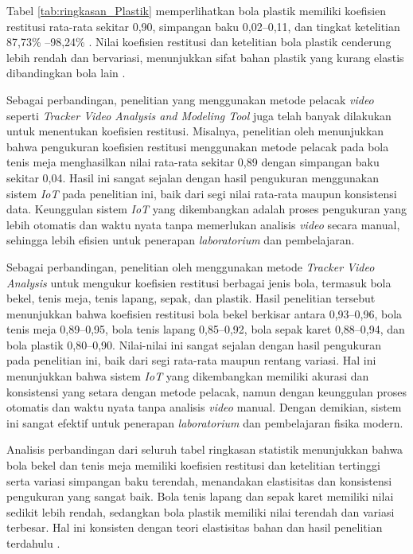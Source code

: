 Tabel \ref{tab:ringkasan_Plastik} memperlihatkan bola plastik memiliki koefisien restitusi rata-rata sekitar 0,90, simpangan baku 0,02--0,11, dan tingkat ketelitian 87,73\% --98,24\% . Nilai koefisien restitusi dan ketelitian bola plastik cenderung lebih rendah dan bervariasi, menunjukkan sifat bahan plastik yang kurang elastis dibandingkan bola lain \citep{garcia2021elastic}.

Sebagai perbandingan, penelitian yang menggunakan metode pelacak \textit{video} seperti \textit{Tracker Video Analysis and Modeling Tool} juga telah banyak dilakukan untuk menentukan koefisien restitusi. Misalnya, penelitian oleh \citep{putra2019tracker} menunjukkan bahwa pengukuran koefisien restitusi menggunakan metode pelacak pada bola tenis meja menghasilkan nilai rata-rata sekitar 0,89 dengan simpangan baku sekitar 0,04. Hasil ini sangat sejalan dengan hasil pengukuran menggunakan sistem \textit{IoT} pada penelitian ini, baik dari segi nilai rata-rata maupun konsistensi data. Keunggulan sistem \textit{IoT} yang dikembangkan adalah proses pengukuran yang lebih otomatis dan waktu nyata tanpa memerlukan analisis \textit{video} secara manual, sehingga lebih efisien untuk penerapan \textit{laboratorium} dan pembelajaran.

Sebagai perbandingan, penelitian oleh \citep{juita2020tracker} menggunakan metode \textit{Tracker Video Analysis} untuk mengukur koefisien restitusi berbagai jenis bola, termasuk bola bekel, tenis meja, tenis lapang, sepak, dan plastik. Hasil penelitian tersebut menunjukkan bahwa koefisien restitusi bola bekel berkisar antara 0,93--0,96, bola tenis meja 0,89--0,95, bola tenis lapang 0,85--0,92, bola sepak karet 0,88--0,94, dan bola plastik 0,80--0,90. Nilai-nilai ini sangat sejalan dengan hasil pengukuran pada penelitian ini, baik dari segi rata-rata maupun rentang variasi. Hal ini menunjukkan bahwa sistem \textit{IoT} yang dikembangkan memiliki akurasi dan konsistensi yang setara dengan metode pelacak, namun dengan keunggulan proses otomatis dan waktu nyata tanpa analisis \textit{video} manual. Dengan demikian, sistem ini sangat efektif untuk penerapan \textit{laboratorium} dan pembelajaran fisika modern.

Analisis perbandingan dari seluruh tabel ringkasan statistik menunjukkan bahwa bola bekel dan tenis meja memiliki koefisien restitusi dan ketelitian tertinggi serta variasi simpangan baku terendah, menandakan elastisitas dan konsistensi pengukuran yang sangat baik. Bola tenis lapang dan sepak karet memiliki nilai sedikit lebih rendah, sedangkan bola plastik memiliki nilai terendah dan variasi terbesar. Hal ini konsisten dengan teori elastisitas bahan dan hasil penelitian terdahulu \citep{meyer2020coefficient, smith2018experimental}.
